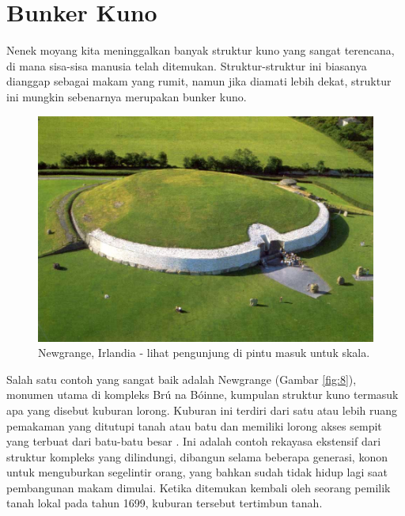 \documentclass[10pt,twocolumn,letterpaper]{article}
\begin{document}
\section{Bunker Kuno}

Nenek moyang kita meninggalkan banyak struktur kuno yang sangat terencana, di mana sisa-sisa manusia telah ditemukan. Struktur-struktur ini biasanya dianggap sebagai makam yang rumit, namun jika diamati lebih dekat, struktur ini mungkin sebenarnya merupakan bunker kuno.

\begin{figure}[b]
\begin{center}
   \includegraphics[width=1\linewidth]{ww19.jpg}
\end{center}
   \caption{Newgrange, Irlandia - lihat pengunjung di pintu masuk untuk skala.}
\label{fig:8}
\label{fig:onecol}
\end{figure}

Salah satu contoh yang sangat baik adalah Newgrange (Gambar \ref{fig:8}), monumen utama di kompleks Brú na Bóinne, kumpulan struktur kuno termasuk apa yang disebut kuburan lorong. Kuburan ini terdiri dari satu atau lebih ruang pemakaman yang ditutupi tanah atau batu dan memiliki lorong akses sempit yang terbuat dari batu-batu besar \cite{70}. Ini adalah contoh rekayasa ekstensif dari struktur kompleks yang dilindungi, dibangun selama beberapa generasi, konon untuk menguburkan segelintir orang, yang bahkan sudah tidak hidup lagi saat pembangunan makam dimulai. Ketika ditemukan kembali oleh seorang pemilik tanah lokal pada tahun 1699, kuburan tersebut tertimbun tanah.
\end{document}
